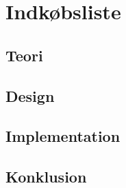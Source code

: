 \section{Indkøbsliste}
\subsection{Teori}
\subsection{Design}
\subsection{Implementation}
\subsection{Konklusion}
